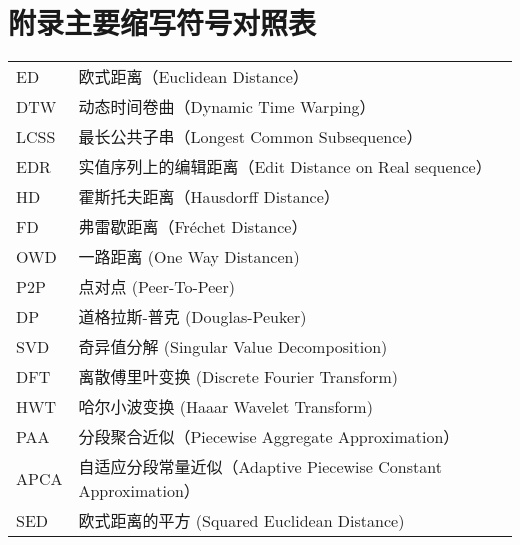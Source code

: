 \newpage
\chapter*{附录\quad 主要缩写符号对照表}
\vskip 5mm

\begin{tabular}{p{}p{}}
	ED  &  欧式距离（Euclidean Distance）  \\
	DTW  & 动态时间卷曲（Dynamic Time Warping）  \\
	LCSS  & 最长公共子串（Longest Common Subsequence）  \\
	EDR  & 实值序列上的编辑距离（Edit Distance on Real sequence）  \\
	HD & 霍斯托夫距离（Hausdorff Distance）  \\
	FD  & 弗雷歇距离（Fréchet Distance）  \\
	OWD  & 一路距离 (One Way Distancen)  \\
	P2P  & 点对点 (Peer-To-Peer) \\
	DP  & 道格拉斯-普克 (Douglas-Peuker)  \\
	SVD & 奇异值分解 (Singular Value Decomposition)  \\
	DFT  & 离散傅里叶变换 (Discrete Fourier Transform) \\
	HWT & 哈尔小波变换 (Haaar Wavelet Transform)  \\
	PAA & 分段聚合近似（Piecewise Aggregate Approximation）  \\
	APCA & 自适应分段常量近似（Adaptive Piecewise Constant Approximation）\\
	SED & 欧式距离的平方 (Squared Euclidean Distance)\\
\end{tabular}


\clearpage
\phantom{s}
\clearpage
 

